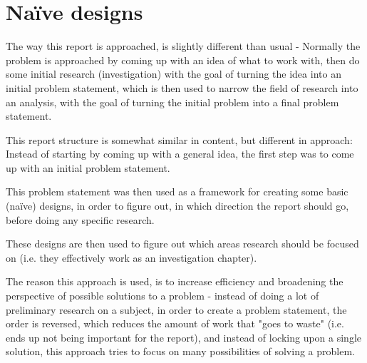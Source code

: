 \section{Naïve designs}
The way this report is approached, is slightly different than usual - Normally the problem is approached by coming up with an idea of what to work with, then do some initial research (investigation) with the goal of turning the idea into an initial problem statement, which is then used to narrow the field of research into an analysis, with the goal of turning the initial problem into a final problem statement.

This report structure is somewhat similar in content, but different in approach:
Instead of starting by coming up with a general idea, the first step was to come up with an initial problem statement.

This problem statement was then used as a framework for creating some basic (naïve) designs, in order to figure out, in which direction the report should go, before doing any specific research.

These designs are then used to figure out which areas research should be focused on (i.e. they effectively work as an investigation chapter).
\bigskip

The reason this approach is used, is to increase efficiency and broadening the perspective of possible solutions to a problem - instead of doing a lot of preliminary research on a subject, in order to create a problem statement, the order is reversed, which reduces the amount of work that "goes to waste" (i.e. ends up not being important for the report), and instead of locking upon a single solution, this approach tries to focus on many possibilities of solving a problem.


